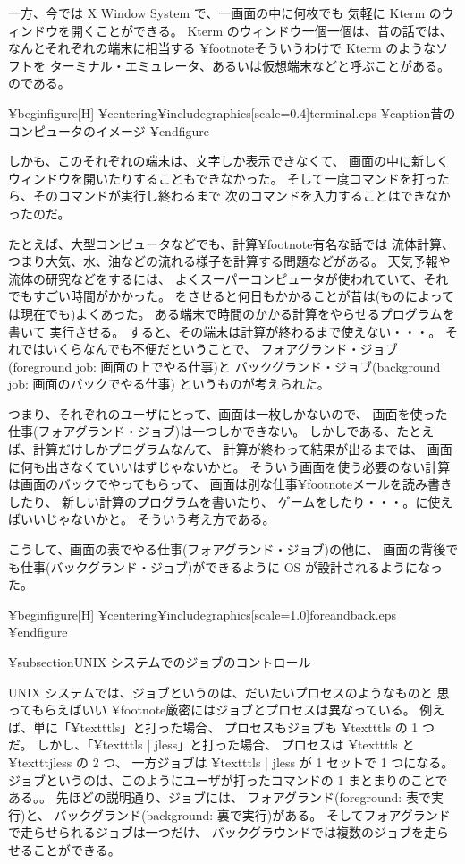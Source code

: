 一方、今では X Window System で、一画面の中に何枚でも
気軽に Kterm のウィンドウを開くことができる。
 Kterm のウィンドウ一個一個は、昔の話では、
なんとそれぞれの端末に相当する
¥footnote{そういうわけで Kterm のようなソフトを
ターミナル・エミュレータ、あるいは仮想端末などと呼ぶことがある。}
のである。

¥begin{figure}[H]
¥centering{¥includegraphics[scale=0.4]{terminal.eps}}
¥caption{昔のコンピュータのイメージ}
¥end{figure}


しかも、このそれぞれの端末は、文字しか表示できなくて、
画面の中に新しくウィンドウを開いたりすることもできなかった。
そして一度コマンドを打ったら、そのコマンドが実行し終わるまで
次のコマンドを入力することはできなかったのだ。

たとえば、大型コンピュータなどでも、計算¥footnote{有名な話では
流体計算、つまり大気、水、油などの流れる様子を計算する問題などがある。
天気予報や流体の研究などをするには、
よくスーパーコンピュータが使われていて、それでもすごい時間がかかった。}
をさせると何日もかかることが昔は(ものによっては現在でも)よくあった。
ある端末で時間のかかる計算をやらせるプログラムを書いて
実行させる。
すると、その端末は計算が終わるまで使えない・・・。
それではいくらなんでも不便だということで、
フォアグランド・ジョブ(foreground job: 画面の上でやる仕事)と
バックグランド・ジョブ(background job: 画面のバックでやる仕事)
というものが考えられた。

つまり、それぞれのユーザにとって、画面は一枚しかないので、
画面を使った仕事(フォアグランド・ジョブ)は一つしかできない。
しかしである、たとえば、計算だけしかプログラムなんて、
計算が終わって結果が出るまでは、
画面に何も出さなくていいはずじゃないかと。
そういう画面を使う必要のない計算は画面のバックでやってもらって、
画面は別な仕事¥footnote{メールを読み書きしたり、
新しい計算のプログラムを書いたり、
ゲームをしたり・・・。}に使えばいいじゃないかと。
そういう考え方である。

こうして、画面の表でやる仕事(フォアグランド・ジョブ)の他に、
画面の背後でも仕事(バックグランド・ジョブ)ができるように
OS が設計されるようになった。

¥begin{figure}[H]
¥centering{¥includegraphics[scale=1.0]{foreandback.eps}}
¥end{figure}

¥subsection{UNIX システムでのジョブのコントロール}

UNIX システムでは、ジョブというのは、だいたいプロセスのようなものと
思ってもらえばいい
¥footnote{厳密にはジョブとプロセスは異なっている。
例えば、単に「¥texttt{ls}」と打った場合、
プロセスもジョブも ¥texttt{ls} の 1 つだ。
しかし、「¥texttt{ls | jless}」と打った場合、
プロセスは ¥texttt{ls} と ¥texttt{jless} の 2 つ、
一方ジョブは ¥texttt{ls | jless} が 1 セットで 1 つになる。
ジョブというのは、このようにユーザが打ったコマンドの 1 まとまりのことである。}。
先ほどの説明通り、ジョブには、
フォアグランド(foreground: 表で実行)と、
バックグランド(background: 裏で実行)がある。
そしてフォアグランドで走らせられるジョブは一つだけ、
バックグラウンドでは複数のジョブを走らせることができる。

